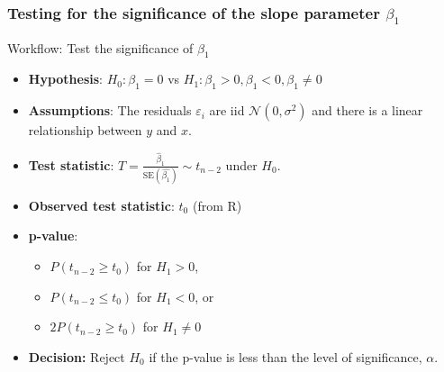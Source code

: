 \documentclass[a4paper]{article}
\begin{document}
\subsubsection{Testing for the significance of the slope parameter \( \beta_1 \)}
\begin{redbox}{Workflow: Test the significance of \( \beta_1 \)}
	\begin{itemize}
		\item \textbf{Hypothesis}: \( H_0: \beta_1=0 \) vs \( H_1: \beta_1 > 0, \beta_1 < 0, \beta_1 \neq 0 \)
		\item \textbf{Assumptions}: The residuals \( \varepsilon_i \) are iid \( \mathcal{N}(0,\sigma^2) \) and there is a linear relationship between \( y \) and \( x \).
		\item \textbf{Test statistic}: \( T = \frac{\hat{\beta}_1}{\text{SE}(\hat{\beta_1})} \sim t_{n-2} \) under \( H_0 \).
		\item \textbf{Observed test statistic}: \( t_0 \) (from R)
		\item \textbf{p-value}:
		\begin{itemize}
			\item \( P(t_{n-2} \geq t_0) \) for \( H_1 > 0 \), 
			\item \( P(t_{n-2} \leq t_0) \) for \( H_1 < 0 \), or 
			\item \( 2P(t_{n-2} \geq t_0) \) for \( H_1 \neq 0 \) 
		\end{itemize}
		\item \textbf{Decision:} Reject \( H_0 \) if the p-value is less than the level of significance, \( \alpha \).
	\end{itemize}
\end{redbox}
\end{document}
